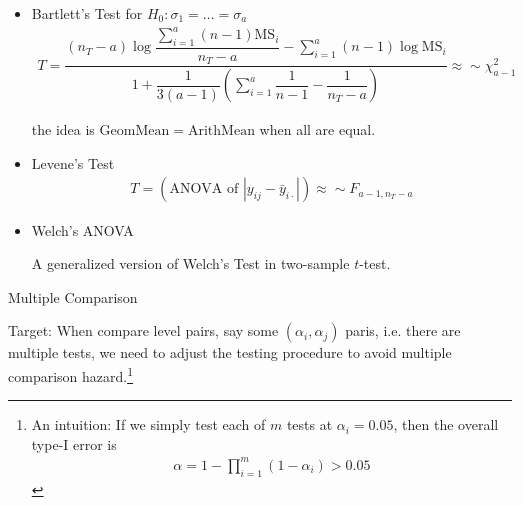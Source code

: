 \begin{itemize}[topsep=2pt,itemsep=0pt]
    \item Bartlett's Test for $ H_0:\sigma _1=\ldots=\sigma _a $
    \begin{align*}
        T=\dfrac{ (n_T-a)\log\dfrac{\sum_{i=1}^a (n-1)\mathrm{ MS }_i  }{ n_T-a } -\sum_{i=1}^a(n-1)\log \mathrm{MS}_i   }{ 1+\dfrac{ 1 }{ 3(a-1) }\left(\sum_{i=1}^a\dfrac{ 1 }{ n-1 }-\dfrac{ 1 }{ n_T-a }  \right)  }\approx \sim \chi^2_{a-1}  
    \end{align*}

    the idea is $ \mathrm{ GeomMean }=\mathrm{ ArithMean }   $ when all are equal.
    
    
    \item Levene's Test
    \begin{align*}
        T=(\text{ANOVA of }|y_{ij}-\bar{y}_{i\cdot }|)\approx \sim F_{a-1,n_T-a}
    \end{align*}
    
    \item Welch's ANOVA
    
    A generalized version of Welch's Test in two-sample $ t $-test.
    
\end{itemize}

    

\begin{point}
    \hypertarget{DoEMultipleComparison}{Multiple Comparison}
\end{point}

Target: When compare level pairs, say some $ (\alpha _i, \alpha _j) $ paris, i.e. there are multiple tests, we need to adjust the testing procedure to avoid multiple comparison hazard.\footnote{An intuition: If we simply test each of $ m $ tests at $ \alpha_i = 0.05 $, then the overall type-I error is 
\begin{align*}
    \alpha = 1-\prod_{i=1}^m(1-\alpha _i)>0.05
\end{align*}
}

